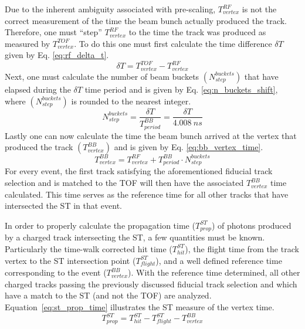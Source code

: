{Due to the inherent ambiguity associated with pre-scaling,  $T^{RF}_{vertex}$ is not the correct measurement of the time the beam bunch actually produced the track.  Therefore, one must ``step'' $T^{RF}_{vertex}$ to the time the track was produced as measured by $T^{TOF}_{vertex}$.  To do this one must first calculate the time difference $\delta T$ given by Eq. \ref{eq:rf_delta_t}.
	\begin{equation} \label{eq:rf_delta_t}
		\delta T = T^{TOF}_{vertex} - T^{RF}_{vertex}
	\end{equation}
Next, one must calculate the number of beam buckets $(N^{buckets}_{step})$ that have elapsed during the $\delta T$ time period and is given by Eq. \ref{eq:n_buckets_shift}, where $(N^{buckets}_{step})$ is rounded to the nearest integer.
	\begin{equation} \label{eq:n_buckets_shift}
		N^{buckets}_{step} = \frac{\delta T}{T^{BB}_{period}} = \frac{\delta T}{4.008\ ns}
	\end{equation}
Lastly one can now calculate the time the beam bunch arrived at the vertex that produced the track $(T^{BB}_{vertex})$ and is given by Eq. \ref{eq:bb_vertex_time}.
	\begin{equation} \label{eq:bb_vertex_time}
		T^{BB}_{vertex} = T^{RF}_{vertex} + T^{BB}_{period} \cdot N^{buckets}_{step}
	\end{equation}
For every event, the first track satisfying the aforementioned fiducial track selection and is matched to the TOF will then have the associated $T^{BB}_{vertex}$ time calculated.  This time serves as the reference time for all other tracks that have intersected the ST in that event.


In order to properly calculate the propagation time ($T^{ST}_{prop}$) of photons produced by a charged track intersecting the ST, a few quantities must be known.  Particularly the time-walk corrected hit time ($T^{ST}_{hit}$), the flight time from the track vertex to the ST intersection point ($T^{ST}_{flight}$), and a well defined reference time corresponding to the event ($T^{BB}_{vertex}$).  With the reference time determined, all other charged tracks passing the previously discussed fiducial track selection and which have a match to the ST (and not the TOF) are analyzed.  Equation~\ref{eq:st_prop_time} illustrates the ST measure of the vertex time.
	\begin{equation} \label{eq:st_prop_time}
		T^{ST}_{prop} = T^{ST}_{hit} - T^{ST}_{flight} - T^{BB}_{vertex}
	\end{equation} 

}
